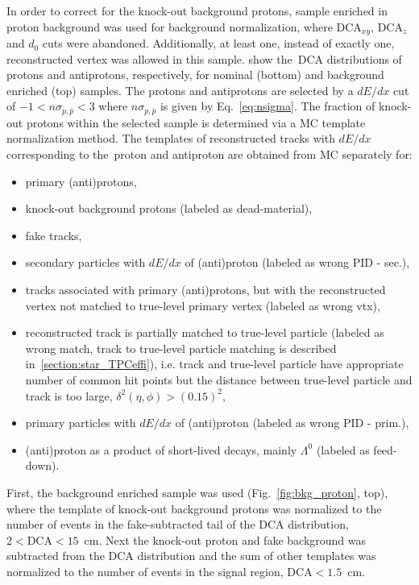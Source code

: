 In order to correct for the knock-out background protons, sample enriched in proton background  was used for background normalization, where $\textrm{DCA}_{xy}$, $\textrm{DCA}_z$ and $d_0$ cuts were abandoned. Additionally, at least one, instead of exactly one,  reconstructed vertex was allowed in this sample.   show the~$\textrm{DCA}$ distributions of protons and antiprotons, respectively, for  nominal (bottom) and background enriched (top) samples. %
The protons and antiprotons are selected by a $dE/dx$ cut of $-1 < n\sigma_{p,\bar{p}} < 3$ where $n\sigma_{p,\bar{p}}$ is given by Eq.~\eqref{eq:nsigma}. The fraction of knock-out protons within the selected sample is determined via a MC template normalization method. The templates of reconstructed tracks with $dE/dx$ corresponding to the~proton and antiproton are obtained from MC separately for:
\begin{itemize}
	\item primary (anti)protons,
	\item knock-out background protons (labeled as dead-material),
	\item fake tracks,
	\item secondary particles with $dE/dx$ of (anti)proton (labeled as wrong PID - sec.),
	\item tracks associated with primary (anti)protons, but with the reconstructed vertex  not matched to true-level primary vertex (labeled as wrong vtx),
	\item reconstructed track is partially matched to true-level particle (labeled as wrong match, track to true-level particle matching is described in~\ref{section:star_TPCeffi}), i.e.  track and true-level particle have appropriate number of common hit points but the distance between true-level particle and track is too large, $\delta^2\left(\eta,\phi\right)>\left(0.15\right)^2$, 
	\item primary particles with $dE/dx$ of (anti)proton (labeled as wrong PID - prim.),
	\item (anti)proton as a product of short-lived decays, mainly $\Lambda^0$ (labeled as feed-down).
\end{itemize}



First, the background enriched sample was used  (Fig.~\ref{fig:bkg_proton}, top), where the template of knock-out background protons was normalized to the number of events in the fake-subtracted tail of the $\textrm{DCA}$ distribution, $2<\textrm{DCA}<15$~cm. Next the knock-out proton and fake background was subtracted from the $\textrm{DCA}$ distribution and the sum of other templates was normalized to the number of events in the signal region,  $\textrm{DCA}<1.5$~cm. 

